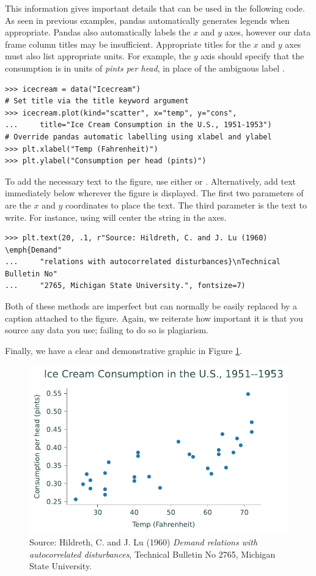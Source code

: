 This information gives important details that can be used in the following code.
As seen in previous examples, pandas automatically generates legends when appropriate.
Pandas also automatically labels the $x$ and $y$ axes, however our data frame column titles may be insufficient.
Appropriate titles for the $x$ and $y$ axes must also list appropriate units.
For example, the $y$ axis should specify that the consumption is in units of \emph{pints per head}, in place of the ambiguous label .

\begin{lstlisting}
>>> icecream = data("Icecream")
# Set title via the title keyword argument
>>> icecream.plot(kind="scatter", x="temp", y="cons",
...		title="Ice Cream Consumption in the U.S., 1951-1953")
# Override pandas automatic labelling using xlabel and ylabel
>>> plt.xlabel("Temp (Fahrenheit)")
>>> plt.ylabel("Consumption per head (pints)")
\end{lstlisting}

To add the necessary text to the figure, use either  or .
Alternatively, add text immediately below wherever the figure is displayed.
The first two parameters of  are the $x$ and $y$ coordinates to place the text.
The third parameter is the text to write.
For instance, using  will center the  string in the axes.


\begin{lstlisting}
>>> plt.text(20, .1, r"Source: Hildreth, C. and J. Lu (1960) \emph{Demand"
...     "relations with autocorrelated disturbances}\nTechnical Bulletin No"
...     "2765, Michigan State University.", fontsize=7)
\end{lstlisting}

Both of these methods are imperfect but can normally be easily replaced by a caption attached to the figure.
Again, we reiterate how important it is that you source any data you use; failing to do so is plagiarism.

Finally, we have a clear and demonstrative graphic in Figure \ref{fig:labels}.

\begin{figure}[H]
    \centering
    \includegraphics[width=.7\textwidth]{figures/ice_cream_good.pdf}
    \caption{Source:  Hildreth, C. and J. Lu (1960) \emph{Demand relations with autocorrelated disturbances}, Technical Bulletin No 2765, Michigan State University.}
    \label{fig:labels}
\end{figure}

